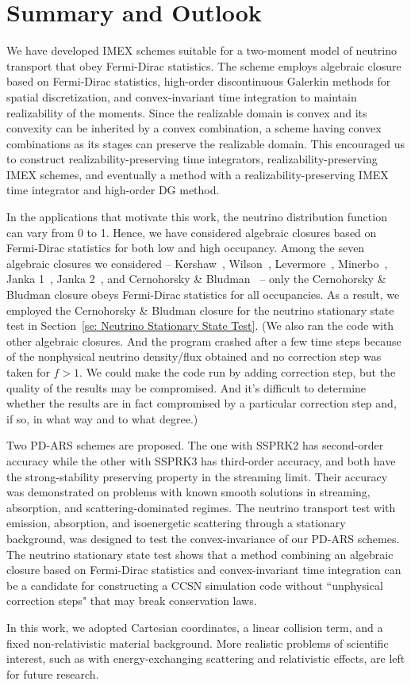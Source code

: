 \section{Summary and Outlook}\label{se:Summary}

We have developed IMEX schemes suitable for a two-moment model of neutrino transport that obey Fermi-Dirac statistics.
The scheme employs algebraic closure based on Fermi-Dirac statistics, high-order discontinuous Galerkin methods for spatial discretization, and convex-invariant time integration to maintain realizability of the moments.  
Since the realizable domain is convex and its convexity can be inherited by a convex combination, a scheme having convex combinations as its stages can preserve the realizable domain.
This encouraged us to construct realizability-preserving time integrators, realizability-preserving IMEX schemes, and eventually a method with a realizability-preserving IMEX time integrator and high-order DG method.  

In the applications that motivate this work, the neutrino distribution function can vary from 0 to 1.  
Hence, we have considered algebraic closures based on Fermi-Dirac statistics for both low and high occupancy.  
Among the seven algebraic closures we considered -- Kershaw~\cite{kershaw_1976}, Wilson~\cite{wilson_1975,leblancWilson_1970}, Levermore~\cite{levermore_1984}, Minerbo~\cite{minerbo_1978}, Janka 1~\cite{janka_1991}, Janka 2~\cite{janka_1992}, and Cernohorsky \& Bludman~\cite{cernohorskyBludman_1994} -- only the Cernohorsky \& Bludman closure obeys Fermi-Dirac statistics for all occupancies.  
As a result, we employed the Cernohorsky \& Bludman closure for the neutrino stationary state test in Section~\ref{se: Neutrino Stationary State Test}.
(We also ran the code with other algebraic closures.
And the program crashed after a few time steps because of the nonphysical neutrino density/flux obtained and no correction step was taken for $f>1$.
We could make the code run by adding correction step, but the quality of the results may be compromised.
And it's difficult to determine whether the results are in fact compromised by a particular correction step and, if so, in what way and to what degree.)

Two PD-ARS schemes are proposed.
The one with SSPRK2 has second-order accuracy while the other with SSPRK3 has third-order accuracy, and both have the strong-stability preserving property in the streaming limit.  
Their accuracy was demonstrated on problems with known smooth solutions in streaming, absorption, and scattering-dominated regimes.
The neutrino transport test with emission, absorption, and isoenergetic scattering through a stationary background, was designed to test the convex-invariance of our PD-ARS schemes. 
The neutrino stationary state test shows that a method combining an algebraic closure based on Fermi-Dirac statistics and convex-invariant time integration can be a candidate for constructing a CCSN simulation code without ``unphysical correction steps" that may break conservation laws.

In this work, we adopted Cartesian coordinates, a linear collision term, and a fixed non-relativistic material background.
More realistic problems of scientific interest, such as with energy-exchanging scattering and relativistic effects, are left for future research.